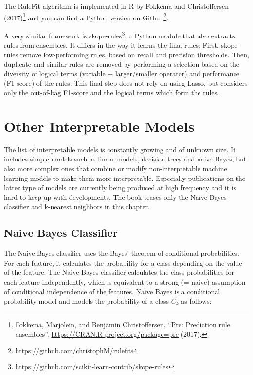 \documentclass[12pt,]{krantz}
\renewcommand{\href}[2]{#2\footnote{\url{#1}}}
\begin{document}
The RuleFit algorithm is implemented in R by Fokkema and Christoffersen
(2017)\footnote{Fokkema, Marjolein, and Benjamin Christoffersen. ``Pre:
  Prediction rule ensembles''.
  \url{https://CRAN.R-project.org/package=pre} (2017).} and you can find
a \href{https://github.com/christophM/rulefit}{Python version on
Github}.

A very similar framework is
\href{https://github.com/scikit-learn-contrib/skope-rules}{skope-rules},
a Python module that also extracts rules from ensembles. It differs in
the way it learns the final rules: First, skope-rules remove
low-performing rules, based on recall and precision thresholds. Then,
duplicate and similar rules are removed by performing a selection based
on the diversity of logical terms (variable + larger/smaller operator)
and performance (F1-score) of the rules. This final step does not rely
on using Lasso, but considers only the out-of-bag F1-score and the
logical terms which form the rules.

\newpage

\hypertarget{other-interpretable}{\section{Other Interpretable
Models}\label{other-interpretable}}

The list of interpretable models is constantly growing and of unknown
size. It includes simple models such as linear models, decision trees
and naive Bayes, but also more complex ones that combine or modify
non-interpretable machine learning models to make them more
interpretable. Especially publications on the latter type of models are
currently being produced at high frequency and it is hard to keep up
with developments. The book teases only the Naive Bayes classifier and
k-nearest neighbors in this chapter.

\subsection{Naive Bayes Classifier}\label{naive-bayes-classifier}

The Naive Bayes classifier uses the Bayes' theorem of conditional
probabilities. For each feature, it calculates the probability for a
class depending on the value of the feature. The Naive Bayes classifier
calculates the class probabilities for each feature independently, which
is equivalent to a strong (= naive) assumption of conditional
independence of the features. Naive Bayes is a conditional probability
model and models the probability of a class \(C_k\) as follows:
\end{document}
